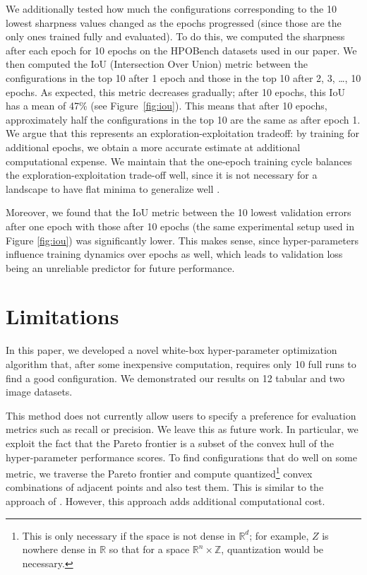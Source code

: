 \documentclass[preprint,12pt]{elsarticle}
\begin{document}
We additionally tested how much the configurations corresponding to the 10 lowest sharpness values changed as the epochs progressed (since those are the only ones trained fully and evaluated). To do this, we computed the sharpness after each epoch for 10 epochs on the HPOBench datasets used in our paper. We then computed the IoU (Intersection Over Union) metric between the configurations in the top 10 after 1 epoch and those in the top 10 after 2, 3, …, 10 epochs. As expected, this metric decreases gradually; after 10 epochs, this IoU has a mean of 47\% (see Figure~\ref{fig:iou}). This means that after 10 epochs, approximately half the configurations in the top 10 are the same as after epoch 1. We argue that this represents an exploration-exploitation tradeoff: by training for additional epochs, we obtain a more accurate estimate at additional computational expense. We maintain that the one-epoch training cycle balances the exploration-exploitation trade-off well, since it is not necessary for a landscape to have flat minima to generalize well \cite{wen2023sharpness, dinh2017sharp}.

Moreover, we found that the IoU metric between the 10 lowest validation errors after one epoch with those after 10 epochs (the same experimental setup used in Figure \ref{fig:iou}) was significantly lower. This makes sense, since hyper-parameters influence training dynamics over epochs as well, which leads to validation loss being an unreliable predictor for future performance.

\section{Limitations}

In this paper, we developed a novel white-box hyper-parameter optimization algorithm that, after some inexpensive computation, requires only 10 full runs to find a good configuration. We demonstrated our results on 12 tabular and two image datasets.

This method does not currently allow users to specify a preference for evaluation metrics such as recall or precision. We leave this as future work. In particular, we exploit the fact that the Pareto frontier is a subset of the convex hull of the hyper-parameter performance scores. To find configurations that do well on some metric, we traverse the Pareto frontier and compute quantized\footnote{This is only necessary if the space is not dense in $\mathbb{R}^d$; for example, $Z$ is nowhere dense in $\mathbb{R}$ so that for a space $\mathbb{R}^n \times \mathbb{Z}$, quantization would be necessary.} convex combinations of adjacent points and also test them. This is similar to the approach of \citet{ammar2004multi}. However, this approach adds additional computational cost.
\end{document}
